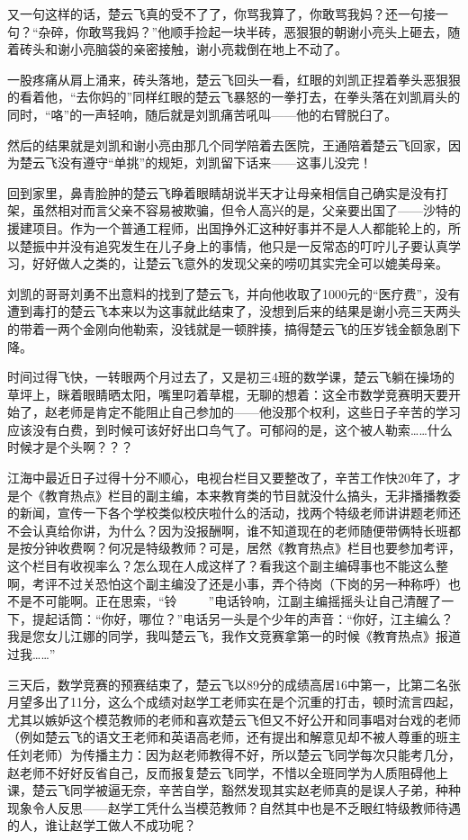 又一句这样的话，楚云飞真的受不了了，你骂我算了，你敢骂我妈？还一句接一句？“杂碎，你敢骂我妈？”他顺手捡起一块半砖，恶狠狠的朝谢小亮头上砸去，随着砖头和谢小亮脑袋的亲密接触，谢小亮栽倒在地上不动了。

一股疼痛从肩上涌来，砖头落地，楚云飞回头一看，红眼的刘凯正捏着拳头恶狠狠的看着他，“去你妈的”同样红眼的楚云飞暴怒的一拳打去，在拳头落在刘凯肩头的同时，“咯”的一声轻响，随后就是刘凯痛苦吼叫——他的右臂脱臼了。

然后的结果就是刘凯和谢小亮由那几个同学陪着去医院，王通陪着楚云飞回家，因为楚云飞没有遵守“单挑”的规矩，刘凯留下话来——这事儿没完！

回到家里，鼻青脸肿的楚云飞睁着眼睛胡说半天才让母亲相信自己确实是没有打架，虽然相对而言父亲不容易被欺骗，但令人高兴的是，父亲要出国了——沙特的援建项目。作为一个普通工程师，出国挣外汇这种好事并不是人人都能轮上的，所以楚振中并没有追究发生在儿子身上的事情，他只是一反常态的叮咛儿子要认真学习，好好做人之类的，让楚云飞意外的发现父亲的唠叨其实完全可以媲美母亲。

刘凯的哥哥刘勇不出意料的找到了楚云飞，并向他收取了1000元的“医疗费”，没有遭到毒打的楚云飞本来以为这事就此结束了，没想到后来的结果是谢小亮三天两头的带着一两个金刚向他勒索，没钱就是一顿胖揍，搞得楚云飞的压岁钱金额急剧下降。

时间过得飞快，一转眼两个月过去了，又是初三4班的数学课，楚云飞躺在操场的草坪上，眯着眼睛晒太阳，嘴里叼着草棍，无聊的想着：这全市数学竞赛明天要开始了，赵老师是肯定不能阻止自己参加的——他没那个权利，这些日子辛苦的学习应该没有白费，到时候可该好好出口鸟气了。可郁闷的是，这个被人勒索……什么时候才是个头啊？？？

江海中最近日子过得十分不顺心，电视台栏目又要整改了，辛苦工作快20年了，才是个《教育热点》栏目的副主编，本来教育类的节目就没什么搞头，无非播播教委的新闻，宣传一下各个学校类似校庆啦什么的活动，找两个特级老师讲讲题老师还不会认真给你讲，为什么？因为没报酬啊，谁不知道现在的老师随便带俩特长班都是按分钟收费啊？何况是特级教师？可是，居然《教育热点》栏目也要参加考评，这个栏目有收视率么？怎么现在人成这样了？看我这个副主编碍事也不能这么整啊，考评不过关恐怕这个副主编没了还是小事，弄个待岗（下岗的另一种称呼）也不是不可能啊。正在思索，“铃~~~~~”电话铃响，江副主编摇摇头让自己清醒了一下，提起话筒：“你好，哪位？”电话另一头是个少年的声音：“你好，江主编么？我是您女儿江娜的同学，我叫楚云飞，我作文竞赛拿第一的时候《教育热点》报道过我……”

三天后，数学竞赛的预赛结束了，楚云飞以89分的成绩高居16中第一，比第二名张月望多出了11分，这么个成绩对赵学工老师实在是个沉重的打击，顿时流言四起，尤其以嫉妒这个模范教师的老师和喜欢楚云飞但又不好公开和同事唱对台戏的老师（例如楚云飞的语文王老师和英语高老师，还有提出和解意见却不被人尊重的班主任刘老师）为传播主力：因为赵老师教得不好，所以楚云飞同学每次只能考几分，赵老师不好好反省自己，反而报复楚云飞同学，不惜以全班同学为人质阻碍他上课，楚云飞同学被逼无奈，辛苦自学，豁然发现其实赵老师真的是误人子弟，种种现象令人反思——赵学工凭什么当模范教师？自然其中也是不乏眼红特级教师待遇的人，谁让赵学工做人不成功呢？

